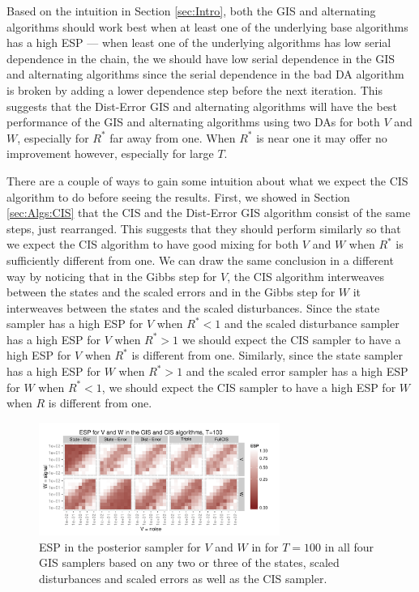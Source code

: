 \documentclass{article}
\begin{document}
Based on the intuition in Section \ref{sec:Intro}, both the GIS and alternating algorithms should work best when at least one of the underlying base algorithms has a high ESP --- when least one of the underlying algorithms has low serial dependence in the chain, the we should have low serial dependence in the GIS and alternating algorithms since the serial dependence in the bad DA algorithm is broken by adding a lower dependence step before the next iteration. This suggests that the Dist-Error GIS and alternating algorithms will have the best performance of the GIS and alternating algorithms using two DAs for both $V$ and $W$, especially for $R^*$ far away from one. When $R^*$ is near one it may offer no improvement however, especially for large $T$.

There are a couple of ways to gain some intuition about what we expect the CIS algorithm to do before seeing the results. First, we showed in Section \ref{sec:Algs:CIS} that the CIS and the Dist-Error GIS algorithm consist of the same steps, just rearranged. This suggests that they should perform similarly so that we expect the CIS algorithm to have good mixing for both $V$ and $W$ when $R^*$ is sufficiently different from one. We can draw the same conclusion in a different way by noticing that in the Gibbs step for $V$, the CIS algorithm interweaves between the states and the scaled errors and in the Gibbs step for $W$ it interweaves between the states and the scaled disturbances. Since the state sampler has a high ESP for $V$ when $R^*<1$ and the scaled disturbance sampler has a high ESP for $V$ when $R^*>1$ we should expect the CIS sampler to have a high ESP for $V$ when $R^*$ is different from one. Similarly, since the state sampler has a high ESP for $W$ when $R^*>1$ and the scaled error sampler has a high ESP for $W$ when $R^*<1$, we should expect the CIS sampler to have a high ESP for $W$ when $R$ is different from one.

\begin{figure}[!ht]
\centering
\includegraphics[width=0.7\textwidth]{intESplot1}
\caption{ESP in the posterior sampler for $V$ and $W$ in for $T=100$ in all four GIS samplers based on any two or three of the states, scaled disturbances and scaled errors as well as the CIS sampler.}
\label{intESplot}
\end{figure}
\end{document}
